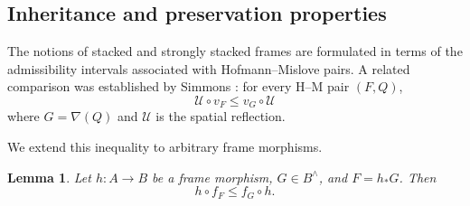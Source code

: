 \documentclass[11pt]{amsart}
\theoremstyle{plain}
\newtheorem{thm}{Theorem}[section]
\newtheorem{lem}[thm]{Lemma}
\theoremstyle{definition}
\begin{document}

\subsection{Inheritance and preservation properties}\label{Permanencia}

The notions of stacked and strongly stacked
frames are formulated in terms of the
admissibility intervals associated with
Hofmann--Mislove pairs. A related comparison
was established by Simmons
\cite[Lemma 8.9 and Corollary 8.10]{simmons2004vietoris}:
for every H--M pair $(F,Q)$,
\[
\mathcal U\circ v_F
\leq v_G\circ\mathcal U
\]
where $G=\nabla(Q)$ and $\mathcal U$ is the spatial reflection.

We extend this inequality to arbitrary
frame morphisms.

\begin{lem}\label{f1f}
Let $h:A\to B$ be a frame morphism,
$G\in B^\wedge$, and $F=h_*G$. Then
\[
h\circ f_F\leq f_G\circ h.
\]
\end{lem}
\end{document}

